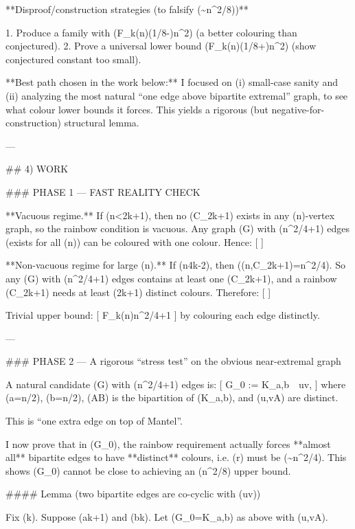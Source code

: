 **Disproof/construction strategies (to falsify (\sim n^2/8))**

1. Produce a family with (F_k(n)\le (1/8-\varepsilon)n^2) (a better colouring than conjectured).
2. Prove a universal lower bound (F_k(n)\ge (1/8+\varepsilon)n^2) (show conjectured constant too small).

**Best path chosen in the work below:** I focused on (i) small-case sanity and (ii) analyzing the most natural “one edge above bipartite extremal” graph, to see what colour lower bounds it forces. This yields a rigorous (but negative-for-construction) structural lemma.

---

## 4) WORK

### PHASE 1 — FAST REALITY CHECK

**Vacuous regime.** If (n<2k+1), then no (C_{2k+1}) exists in any (n)-vertex graph, so the rainbow condition is vacuous. Any graph (G) with (\lfloor n^2/4\rfloor+1) edges (exists for all (n)) can be coloured with one colour. Hence:
[
]

**Non-vacuous regime for large (n).** If (n\ge 4k-2), then ((n,C_{2k+1})=\lfloor n^2/4\rfloor).
So any (G) with (\lfloor n^2/4\rfloor+1) edges contains at least one (C_{2k+1}), and a rainbow (C_{2k+1}) needs at least (2k+1) distinct colours. Therefore:
[
]

Trivial upper bound:
[
F_k(n)\le \lfloor n^2/4\rfloor+1
]
by colouring each edge distinctly.

---

### PHASE 2 — A rigorous “stress test” on the obvious near-extremal graph

A natural candidate (G) with (\lfloor n^2/4\rfloor+1) edges is:
[
G_0 := K_{a,b}\ \cup\ {uv},
]
where (a=\lfloor n/2\rfloor), (b=\lceil n/2\rceil), (A\sqcup B) is the bipartition of (K_{a,b}), and (u,v\in A) are distinct.

This is “one extra edge on top of Mantel”.

I now prove that in (G_0), the rainbow requirement actually forces **almost all** bipartite edges to have **distinct** colours, i.e. (r) must be (\sim n^2/4). This shows (G_0) cannot be close to achieving an (n^2/8) upper bound.

#### Lemma (two bipartite edges are co-cyclic with (uv))

Fix (k). Suppose (a\ge k+1) and (b\ge k). Let (G_0=K_{a,b}) as above with (u,v\in A).

